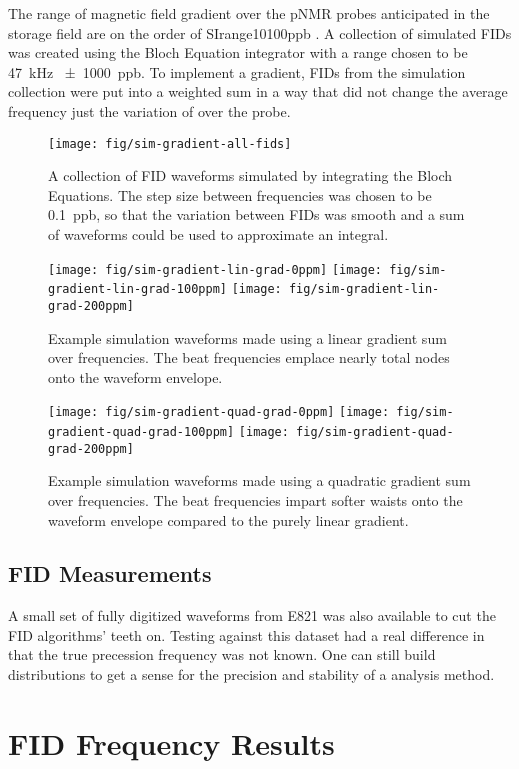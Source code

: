 The range of magnetic field gradient over the pNMR probes anticipated in the \gmtwo storage field are on the order of SIrange{10}{100}{ppb} . A collection of simulated FIDs was created using the Bloch Equation integrator with a range chosen to be \SI{47}{\kHz} \SI{\pm 1000}{ppb}. To implement a gradient, FIDs from the simulation collection were put into a weighted sum in a way that did not change the average frequency just the variation of over the probe.

\begin{figure}
\label{fig:sim-gradient-all-fids}
\texttt{[image: fig/sim-gradient-all-fids]}
\caption{A collection of FID waveforms simulated by integrating the Bloch Equations.  The step size between frequencies was chosen to be \SI{0.1}{ppb}, so that the variation between FIDs was smooth and a sum of waveforms could be used to approximate an integral.}
\end{figure}

\begin{figure}
\label{fig:sim-gradient-lin-grad}
\texttt{[image: fig/sim-gradient-lin-grad-0ppm]}
\texttt{[image: fig/sim-gradient-lin-grad-100ppm]}
\texttt{[image: fig/sim-gradient-lin-grad-200ppm]}
\caption{Example simulation waveforms made using a linear gradient sum over frequencies.  The beat frequencies emplace nearly total nodes onto the waveform envelope.}
\end{figure}

\begin{figure}
\label{fig:sim-gradient-quad-grad}
\texttt{[image: fig/sim-gradient-quad-grad-0ppm]}
\texttt{[image: fig/sim-gradient-quad-grad-100ppm]}
\texttt{[image: fig/sim-gradient-quad-grad-200ppm]}
\caption{Example simulation waveforms made using a quadratic gradient sum over frequencies.  The beat frequencies impart softer waists onto the waveform envelope compared to the purely linear gradient.}
\end{figure}


\subsection{FID Measurements}
A small set of fully digitized waveforms from E821 was also available to cut the FID algorithms' teeth on.  Testing against this dataset had a real difference in that the true precession frequency was not known.  One can still build distributions to get a sense for the precision and stability of a analysis method.


\section{FID Frequency Results}

